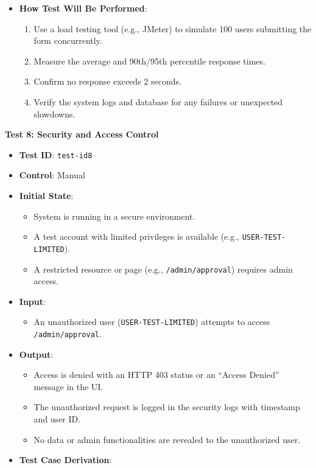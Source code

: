 \documentclass[12pt, titlepage]{article}
\begin{document}
\begin{itemize}
    \item \textbf{How Test Will Be Performed}:
    \begin{enumerate}
        \item Use a load testing tool (e.g., JMeter) to simulate 100 users submitting the form concurrently.
        \item Measure the average and 90th/95th percentile response times.
        \item Confirm no response exceeds 2 seconds.
        \item Verify the system logs and database for any failures or unexpected slowdowns.
    \end{enumerate}
\end{itemize}


\textbf{Test 8: Security and Access Control}
\begin{itemize}
    \item \textbf{Test ID}: \texttt{test-id8}
    \item \textbf{Control}: Manual
    \item \textbf{Initial State}:
    \begin{itemize}
        \item System is running in a secure environment.
        \item A test account with limited privileges is available (e.g., \texttt{USER-TEST-LIMITED}).
        \item A restricted resource or page (e.g., \texttt{/admin/approval}) requires admin access.
    \end{itemize}
    \item \textbf{Input}:
    \begin{itemize}
        \item An unauthorized user (\texttt{USER-TEST-LIMITED}) attempts to access \texttt{/admin/approval}.
    \end{itemize}
    \item \textbf{Output}:
    \begin{itemize}
        \item Access is denied with an HTTP 403 status or an ``Access Denied'' message in the UI.
        \item The unauthorized request is logged in the security logs with timestamp and user ID.
        \item No data or admin functionalities are revealed to the unauthorized user.
    \end{itemize}
    \item \textbf{Test Case Derivation}:

\end{itemize}
\end{document}
